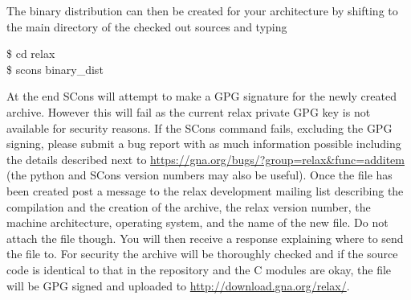 The binary distribution can then be created for your architecture by shifting to the main directory of the checked out sources and typing

\begin{exampleenv}
\$ cd relax \\
\$ scons binary\_dist
\end{exampleenv}

At the end SCons will attempt to make a GPG signature for the newly created archive.  However this will fail as the current relax private GPG key is not available for security reasons.  If the SCons command fails, excluding the GPG signing, please submit a bug report with as much information possible including the details described next to \href{https://gna.org/bugs/?group=relax\&func=additem}{https://gna.org/bugs/?group=relax\&func=additem} (the python and SCons version numbers may also be useful).  Once the file has been created post a message to the relax development mailing list describing the compilation and the creation of the archive, the relax version number, the machine architecture, operating system, and the name of the new file.  Do not attach the file though.  You will then receive a response explaining where to send the file to.  For security the archive will be thoroughly checked and if the source code is identical to that in the repository and the C modules are okay, the file will be GPG signed and uploaded to \href{http://download.gna.org/relax/}{http://download.gna.org/relax/}.
